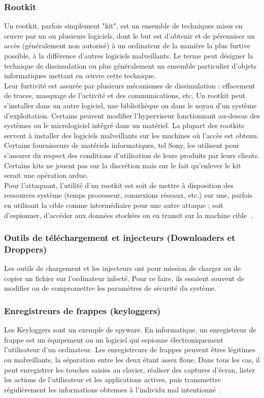 \subsubsection{Rootkit}
Un rootkit, parfois simplement "kit", est un ensemble de techniques mises en œuvre par un ou plusieurs logiciels, dont le but est d'obtenir et de pérenniser un accès (généralement non autorisé) à un ordinateur de la manière la plus furtive possible, à la différence d'autres logiciels malveillants. Le terme peut désigner la technique de dissimulation ou plus généralement un ensemble particulier d'objets informatiques mettant en œuvre cette technique.\\


Leur furtivité est assurée par plusieurs mécanismes de dissimulation : effacement de traces, masquage de l'activité et des communications, etc. Un rootkit peut s'installer dans un autre logiciel, une bibliothèque ou dans le noyau d'un système d'exploitation. Certains peuvent modifier l'hyperviseur fonctionnant au-dessus des systèmes ou le micrologiciel intégré dans un matériel. La plupart des rootkits servent à installer des logiciels malveillants sur les machines où l'accès est obtenu. Certains fournisseurs de matériels informatiques, tel Sony, les utilisent pour s'assurer du respect des conditions d'utilisation de leurs produits par leurs clients. Certains kits ne jouent pas sur la discrétion mais sur le fait qu'enlever le kit serait une opération ardue.\\


Pour l'attaquant, l'utilité d'un rootkit est soit de mettre à disposition des ressources système (temps processeur, connexions réseaux, etc.) sur une, parfois en utilisant la cible comme intermédiaire pour une autre attaque ; soit d'espionner, d'accéder aux données stockées ou en transit sur la machine cible~\cite{rootkit}.
\subsubsection{Outils de téléchargement et injecteurs (Downloaders et Droppers)}
Les outils de chargement et les injecteurs ont pour mission de charger ou de copier un fichier sur l'ordinateur infecté. Pour ce faire, ils essaient souvent de modifier ou de compromettre les paramètres de sécurité du système.
\subsubsection{Enregistreurs de frappes (keyloggers)}
Les Keyloggers sont un exemple de spyware. En informatique, un enregistreur de frappe est un équipement ou un logiciel qui espionne électroniquement l'utilisateur d'un ordinateur. Les enregistreurs de frappes peuvent êtres légitimes ou malveillants, la séparation entre les deux étant assez floue. Dans tous les cas, il peut enregistrer les touches saisies au clavier, réaliser des captures d'écran, lister les actions de l'utilisateur et les applications actives, puis transmettre régulièrement les informations obtenues à l'individu mal intentionné~\cite{mal}. 
